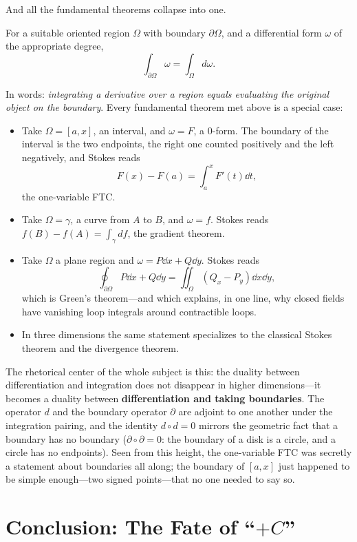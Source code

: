 \documentclass{essay}
\begin{document}
And all the fundamental theorems collapse into one.

\begin{theorem}
  For a suitable oriented region $\Omega$ with boundary $\partial\Omega$, and a differential form $\omega$ of the appropriate degree,
  \[
    \int_{\partial\Omega} \omega = \int_{\Omega} d\omega.
  \]
\end{theorem}

In words: \emph{integrating a derivative over a region equals evaluating the original object on the boundary}. Every fundamental theorem met above is a special case:
\begin{itemize}[itemsep=2pt]
  \item Take $\Omega = [a,x]$, an interval, and $\omega = F$, a 0-form. The boundary of the interval is the two endpoints, the right one counted positively and the left negatively, and Stokes reads
    \[
      F(x) - F(a) = \int_a^x F'(t)\dd t,
    \]
    the one-variable FTC.
  \item Take $\Omega = \gamma$, a curve from $A$ to $B$, and $\omega = f$. Stokes reads $f(B) - f(A) = \int_\gamma df$, the gradient theorem.
  \item Take $\Omega$ a plane region and $\omega = P\dd x + Q\dd y$. Stokes reads
    \[
      \oint_{\partial\Omega} P\dd x + Q\dd y = \iint_\Omega (Q_x - P_y)\dd x \dd y,
    \]
    which is Green's theorem---and which explains, in one line, why closed fields have vanishing loop integrals around contractible loops.
  \item In three dimensions the same statement specializes to the classical Stokes theorem and the divergence theorem.
\end{itemize}

The rhetorical center of the whole subject is this: the duality between differentiation and integration does not disappear in higher dimensions---it becomes a duality between \textbf{differentiation and taking boundaries}. The operator $d$ and the boundary operator $\partial$ are adjoint to one another under the integration pairing, and the identity $d \circ d = 0$ mirrors the geometric fact that a boundary has no boundary ($\partial \circ \partial = 0$: the boundary of a disk is a circle, and a circle has no endpoints). Seen from this height, the one-variable FTC was secretly a statement about boundaries all along; the boundary of $[a,x]$ just happened to be simple enough---two signed points---that no one needed to say so.

\section{Conclusion: The Fate of ``$+C$''}
\end{document}
